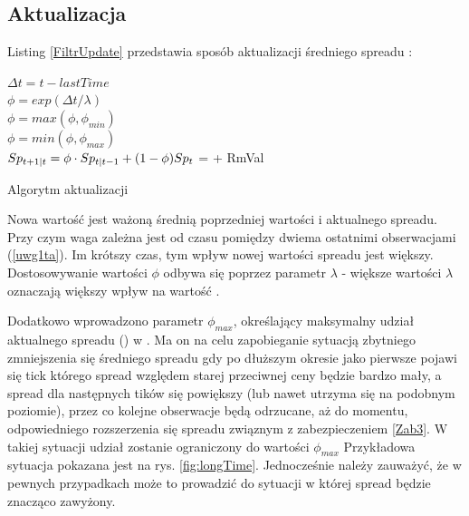 \documentclass[a4paper,12pt,openany, DIV=calc, headsepline]{scrbook}
\begin{document}

\subsection{Aktualizacja \MSpn}

Listing \ref{FiltrUpdate} przedstawia sposób aktualizacji średniego spreadu \MSpn:
\IncMargin{5em}
\begin{algorithm}

{ $\Delta t = t - lastTime$\\
\label{uwg1ta}	$\phi = exp(\Delta t / \lambda)$\\
\label{uwg2ta}	$\phi = max(\phi, \phi_{min})$\\
\label{uwg3ta} 	$\phi = min(\phi, \phi_{max})$ \\ 
\label{line:akt}	$Sp_{t+1|t} = \phi \cdot Sp_{t|t-1} + (1 - \phi) Sp_{t}$
}
{
\label{Zab3} \MSpn = \MSpc + RmVal\\
}
\DecMargin{5em}

\caption{Algorytm aktualizacji \MSpn \label{FiltrUpdate}}
\end{algorithm}

Nowa wartość \MSpn jest ważoną średnią poprzedniej wartości i aktualnego spreadu. Przy czym  waga \Spt zależna jest od czasu pomiędzy dwiema ostatnimi obserwacjami (\ref{uwg1ta}). Im krótszy czas, tym wpływ nowej wartości spreadu jest większy. Dostosowywanie wartości $\phi$ odbywa się poprzez parametr $\lambda$ - większe wartości $\lambda$ oznaczają większy wpływ \Spt na wartość \MSpn. 

Dodatkowo wprowadzono parametr $\phi_{max}$, określający maksymalny udział aktualnego spreadu (\Spt) w \MSpn. Ma on na celu zapobieganie sytuacją zbytniego zmniejszenia się średniego spreadu gdy po dłuższym okresie jako pierwsze pojawi się tick którego spread względem starej przeciwnej ceny będzie bardzo mały, a spread dla następnych tików się powiększy (lub nawet utrzyma się na podobnym poziomie), przez co kolejne obserwacje będą odrzucane, aż do momentu, odpowiedniego rozszerzenia się spreadu związnym z zabezpieczeniem \ref{Zab3}. W takiej sytuacji udział \Spt zostanie ograniczony do wartości $\phi_{max}$ Przykładowa sytuacja pokazana jest na rys. \ref{fig:longTime}. Jednocześnie należy zauważyć, że w pewnych przypadkach może to prowadzić do sytuacji w której spread będzie znacząco zawyżony. 
\end{document}
